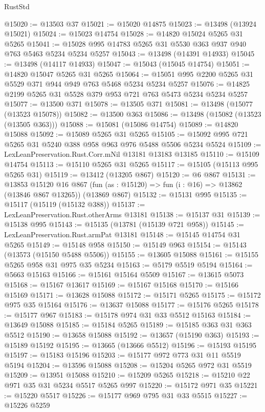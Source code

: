 \begin{lexlean}{RustStd}
\begin{coremodule}
@15020 := @13503 @37
@15021 := @15020 @14875
@15023 := @13498 (@13924 @15021)
@15024 := @15023 @14754
@15028 := @14820 @15024 @5265 @31 @5265
@15041 := @15028 @995 @14783 @5265 @31 @5530 @363 @937 @940 @763 @5463 @5234 @5234 @5257
@15043 := @13498 (@14391 @14933)
@15045 := @13498 (@14117 @14933)
@15047 := @15043 (@15045 @14754)
@15051 := @14820 @15047 @5265 @31 @5265
@15064 := @15051 @995 @2200 @5265 @31 @5529 @371 @944 @949 @763 @5468 @5234 @5234 @5257
@15076 := @14825 @2199 @5265 @31 @5528 @379 @953 @721 @763 @5473 @5234 @5234 @5257
@15077 := @13500 @371
@15078 := @13505 @371
@15081 := @13498 (@15077 (@13523 @15078))
@15082 := @13500 @363
@15086 := @13498 (@15082 (@13523 (@13505 @363)))
@15088 := @15081 (@15086 @14754)
@15089 := @14820 @15088
@15092 := @15089 @5265 @31 @5265
@15105 := @15092 @995 @721 @5265 @31 @5240 @388 @958 @963 @976 @5488 @5506 @5234 @5524
@15109 := LexLeanPreservation.Rust.Corr.mNil @13181 @13183 @13185
@15110 := @15109 @14754
@15113 := @15110 @5265 @31 @5265
@15117 := @15105 (@15113 @995 @5265 @31)
@15119 := @13412 (@13205 @867)
@15120 := @6 @867
@15131 := @13853
    @15120
    @16
    @867
    (fun (as : @15120) => fun (i : @16) => @13862 (@13846 @867 @13265))
    (@13869 @867)
@15132 := @15131 @995
@15135 := @15117 (@15119 (@15132 @388))
@15137 := LexLeanPreservation.Rust.otherArms @13181
@15138 := @15137 @31
@15139 := @15138 @995
@15143 := @15135 (@13781 (@15139 @721 @958))
@15145 := LexLeanPreservation.Rust.armPat @13181
@15148 := @15145 @14754 @31 @5265
@15149 := @15148 @958
@15150 := @15149 @963
@15154 := @15143 (@13573 (@15150 @5488 @5506))
@15155 := @13605 @15088
@15161 := @15155 @5265 @958 @31 @975 @35 @5234
@15163 := @5179 @5519 @5194
@15164 := @5663 @15163
@15166 := @15161 @15164 @5509
@15167 := @13615 @5073
@15168 := @15167 @13617
@15169 := @15167 @15168
@15170 := @15166 @15169
@15171 := @13628 @15088
@15172 := @15171 @5265
@15175 := @15172 @975 @35 @15164
@15176 := @13637 @15088
@15177 := @15176 @5265
@15178 := @15177 @967
@15183 := @15178 @974 @31 @33 @5512 @15163
@15184 := @13649 @15088
@15185 := @15184 @5265
@15189 := @15185 @363 @31 @363 @5512
@15190 := @13658 @15088
@15192 := @13657 (@15190 @363)
@15193 := @15189 @15192
@15195 := @13665 (@13666 @5512)
@15196 := @15193 @15195
@15197 := @15183 @15196
@15203 := @15177 @972 @773 @31 @11 @5519 @5194
@15204 := @13596 @15088
@15208 := @15204 @5265 @972 @31 @5519
@15209 := @13951 @15088
@15210 := @15209 @5265
@15218 := @15210 @22 @971 @35 @31 @5234 @5517 @5265 @997
@15220 := @15172 @971 @35
@15221 := @15220 @5517
@15226 := @15177 @969 @795 @31 @33 @5515
@15227 := @15226 @5259

\end{coremodule}
\end{lexlean}
